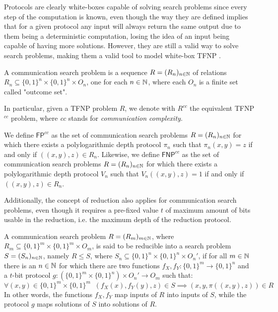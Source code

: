 Protocols are clearly white-boxes capable of solving search problems since every step of the computation is known, even though the way they are defined implies that for a given protocol any input will always return the same output due to them being a deterministic computation, losing the idea of an input being capable of having more solutions. However, they are still a valid way to solve search problems, making them a valid tool to model white-box \textsf{TFNP} \cite{proofs_circuits_communication, tfnp_characterization}.

\begin{definition}
    A communication search problem is a sequence $R = (R_n)_{n \in \mathbb{N}}$ of relations $R_n \subseteq \{0,1\}^n \times \{0,1\}^n \times O_n$, one for each $n \in \mathbb{N}$, where each $O_n$ is a finite set called "outcome set".
\end{definition}

In particular, given a \textsf{TFNP} problem $R$, we denote with $R^{cc}$ the equivalent \textsf{TFNP}$^{cc}$ problem, where \textit{cc} stands for \textit{communication complexity}.

\begin{definition}
    We define $\mathsf{FP}^{cc}$ as the set of communication search problems $R = (R_n)_{n \in \mathbb{N}}$ for which there exists a polylogarithmic depth protocol $\pi_n$ such that $\pi_n(x,y) = z$ if and only if $((x,y), z) \in R_n$. Likewise, we define $\mathsf{FNP}^{cc}$ as the set of communication search problems $R = (R_n)_{n \in \mathbb{N}}$ for which there exists a polylogarithmic depth protocol $V_n$ such that $V_n((x,y), z) = 1$ if and only if $((x,y), z) \in R_n$. 
\end{definition}

Additionally, the concept of reduction also applies for communication search problems, even though it requires a pre-fixed value $t$ of maximum amount of bits usable in the reduction, i.e. the maximum depth of the reduction protocol.

\newpage

\begin{definition}
    A communication search problem $R = (R_m)_{m \in \mathbb{N}}$, where $R_m \subseteq \{0,1\}^m \times \{0,1\}^m \times O_m$, is said to be reducible into a search problem $S = (S_n)_{n \in \mathbb{N}}$, namely $R \leq S$, where $S_n \subseteq \{0,1\}^n \times \{0,1\}^n \times O_n'$, if for all $m \in \mathbb{N}$ there is an $n \in \mathbb{N}$ for which there are two functions $f_X, f_Y : \{0,1\}^m \to \{0,1\}^n$ and a $t$-bit protocol $g : (\{0,1\}^m \times \{0,1\}^n) \times O_n' \to O_m$ such that:
    \[\forall (x,y) \in \{0,1\}^m \times \{0,1\}^m \;\; (f_X(x), f_Y(y), z) \in S \implies (x, y, \pi((x,y), z)) \in R\]
    In other words, the functions $f_X,f_Y$ map inputs of $R$ into inputs of $S$, while the protocol $g$ maps solutions of $S$ into solutions of $R$. 
\end{definition}

